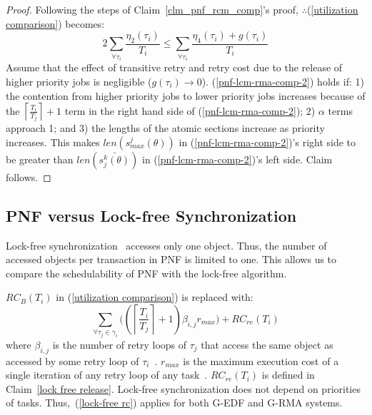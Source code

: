 \begin{proof}
Following the steps of Claim~\ref{clm_pnf_rcm_comp}'s proof, 
$\therefore$(\ref{utilization comparison}) becomes:
\begin{equation}
2\sum_{\forall\tau_{i}}\frac{\eta_{2}(\tau_{i})}{T_{i}}\le\sum_{\forall\tau_{i}}\frac{\eta_{4}(\tau_{i})+g(\tau_{i})}{T_{i}}\label{pnf-lcm-rma-comp-2}
\end{equation}
Assume that the effect of transitive retry and retry cost due
to the release of higher priority jobs is negligible ($g(\tau_{i})\rightarrow0$). (\ref{pnf-lcm-rma-comp-2})
holds if: 1) the contention from higher priority jobs to lower priority
jobs increases because of the $\left\lceil \frac{T_{i}}{T_{j}}\right\rceil +1$
term in the right hand side of (\ref{pnf-lcm-rma-comp-2}); 2) $\alpha$ terms
approach 1; and 3) the lengths of the atomic sections increase as priority
increases. 
%
This makes $len(s_{max}^{j}(\theta))$ in (\ref{pnf-lcm-rma-comp-2})'s right 
side to be greater than $len(\bar{s_{j}^{k}(\theta)})$ in (\ref{pnf-lcm-rma-comp-2})'s left  side.
Claim follows.
\end{proof}

\subsection{PNF versus Lock-free Synchronization\label{pnf vs lock free sec}}

Lock-free synchronization~\cite{key-5,stmconcurrencycontrol:emsoft11} accesses only one object. Thus, the number of accessed objects per transaction in PNF is limited to one. This allows us to compare the schedulability of PNF with the lock-free algorithm. 

$RC_{B}(T_{i})$ in (\ref{utilization comparison}) is replaced with:
%
\begin{equation}
\sum_{\forall\tau_{j}\in\gamma_{i}}\Bigg(\left(\left\lceil \frac{T_{i}}{T_{j}}\right\rceil +1\right)\beta_{i,j}r_{max}\Bigg)+RC_{re}(T_{i})
\label{lock-free rc}
\end{equation}
%
where $\beta_{i,j}$ is the number of retry loops of $\tau_{j}$ that access the same object as accessed by some retry loop of $\tau_{i}$~\cite{key-5}. $r_{max}$ is the maximum execution cost of a single iteration of any retry loop of any task~\cite{key-5}. $RC_{re}(T_i)$ is defined in Claim~\ref{lock free release}. Lock-free synchronization does not depend on priorities  of tasks. Thus,~(\ref{lock-free rc}) applies for both G-EDF and G-RMA systems.


